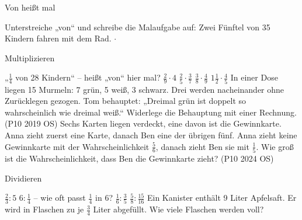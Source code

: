 \setcounter{aufgabe}{17}

\begin{aufgabe}{Von heißt mal}
\begin{teile}
\teil Unterstreiche „von“ und schreibe die Malaufgabe auf: Zwei Fünftel von 35 Kindern fahren mit dem Rad. \leerfeld $\cdot$ \leerfeld
\end{teile}
\end{aufgabe}

\begin{aufgabe}{Multiplizieren}
\begin{teile}
\teil „$\frac{1}{4}$ von 28 Kindern“ – heißt „von“ hier mal? \janein
\teil $\frac{2}{9} \cdot 4$
\teil $\frac{2}{5} \cdot \frac{3}{7}$
\teil $\frac{3}{8} \cdot \frac{4}{9}$
\teil $1\frac{1}{2} \cdot \frac{4}{5}$
\teil In einer Dose liegen 15 Murmeln: 7 grün, 5 weiß, 3 schwarz. Drei werden nacheinander ohne Zurücklegen gezogen. Tom behauptet: „Dreimal grün ist doppelt so wahrscheinlich wie dreimal weiß.“ Widerlege die Behauptung mit einer Rechnung. \hfill (P10 2019 OS)
\teil Sechs Karten liegen verdeckt, eine davon ist die Gewinnkarte. Anna zieht zuerst eine Karte, danach Ben eine der übrigen fünf. Anna zieht keine Gewinnkarte mit der Wahrscheinlichkeit $\frac{5}{6}$, danach zieht Ben sie mit $\frac{1}{5}$. Wie groß ist die Wahrscheinlichkeit, dass Ben die Gewinnkarte zieht? \hfill (P10 2024 OS)
\end{teile}
\end{aufgabe}

\begin{aufgabe}{Dividieren}
\begin{teile}
\teil $\frac{2}{3} : 5$
\teil $6 : \frac{1}{4}$ – wie oft passt $\frac{1}{4}$ in 6?
\teil $\frac{1}{6} : \frac{3}{5}$
\teil $\frac{5}{8} : \frac{15}{16}$
\teil Ein Kanister enthält 9 Liter Apfelsaft. Er wird in Flaschen zu je $\frac{3}{4}$ Liter abgefüllt. Wie viele Flaschen werden voll?
\end{teile}
\end{aufgabe}

